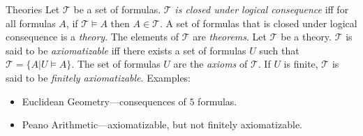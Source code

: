 \documentclass[style=sailor,size=12pt]{powerdot}
\theoremstyle{definition}
\newenvironment{defn}[1]
  {\renewcommand\theinnerdefn{#1}\innerdefn}
  {\endinnerdefn}
\begin{document}
\begin{wideslide}[bm=,toc=]{Theories}
\begin{defn}{2.55}[Ben Ari]
Let $\mathcal{T}$ be a set of formulas. $\mathcal{T}$ \emph{is closed under
logical consequence} iff for all formulas $A$, if $\mathcal{T} \models A$ then
$A \in \mathcal{T}$. A set of formulas that is closed under logical consequence
is a \emph{theory}. The elements of $\mathcal{T}$ are \emph{theorems}.
\end{defn}
\begin{defn}{2.56}[Ben Ari]
Let $\mathcal{T}$ be a theory. $\mathcal{T}$ is said to be \emph{axiomatizable} 
iff there exists a set of formulas $U$ such that  $\mathcal{T} = \{A | U \models
A\}$. The set of formulas $U$ are the \emph{axioms} of $\mathcal{T}$. If $U$ is
finite, $\mathcal{T}$ is said to be \emph{finitely axiomatizable}.
\end{defn}
Examples:
\begin{itemize}
\item Euclidean Geometry---consequences of $5$ formulas.
\item Peano Arithmetic---axiomatizable, but not finitely axiomatizable.
\end{itemize}


\end{wideslide}
\end{document}
